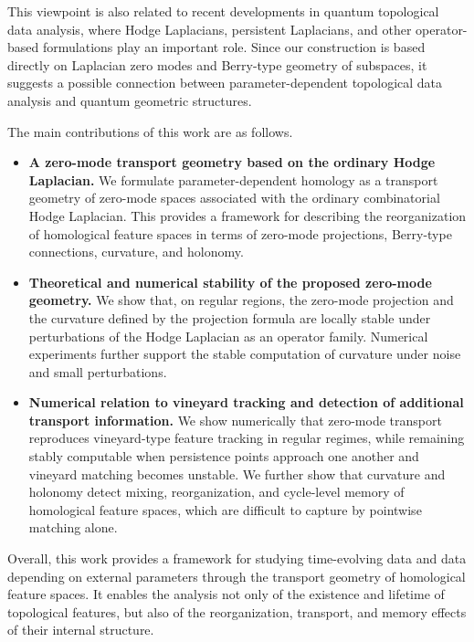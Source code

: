 \documentclass[pdflatex,sn-mathphys-num]{sn-jnl}%
\theoremstyle{thmstyleone}%
\theoremstyle{thmstyletwo}%
\theoremstyle{thmstylethree}%
\begin{document}
This viewpoint is also related to recent developments in quantum topological data analysis\cite{lloyd2016quantum,akhalwaya2024comparing,gyurik2022towards,yamauchi2025quantum,ameneyro2024quantum,hayakawa2022quantum,gyurik2024quantum}, where Hodge Laplacians, persistent Laplacians\cite{wei2025persistent,memoli2022persistent}, and other operator-based formulations play an important role. Since our construction is based directly on Laplacian zero modes and Berry-type geometry of subspaces, it suggests a possible connection between parameter-dependent topological data analysis and quantum geometric structures.

The main contributions of this work are as follows.

\begin{itemize}
    \item \textbf{A zero-mode transport geometry based on the ordinary Hodge Laplacian.}
    We formulate parameter-dependent homology as a transport geometry of zero-mode spaces associated with the ordinary combinatorial Hodge Laplacian. This provides a framework for describing the reorganization of homological feature spaces in terms of zero-mode projections, Berry-type connections, curvature, and holonomy.

    \item \textbf{Theoretical and numerical stability of the proposed zero-mode geometry.}
    We show that, on regular regions, the zero-mode projection and the curvature defined by the projection formula are locally stable under perturbations of the Hodge Laplacian as an operator family. Numerical experiments further support the stable computation of curvature under noise and small perturbations.

    \item \textbf{Numerical relation to vineyard tracking and detection of additional transport information.}
    We show numerically that zero-mode transport reproduces vineyard-type feature tracking in regular regimes, while remaining stably computable when persistence points approach one another and vineyard matching becomes unstable. We further show that curvature and holonomy detect mixing, reorganization, and cycle-level memory of homological feature spaces, which are difficult to capture by pointwise matching alone.
\end{itemize}

Overall, this work provides a framework for studying time-evolving data and data depending on external parameters through the transport geometry of homological feature spaces. It enables the analysis not only of the existence and lifetime of topological features, but also of the reorganization, transport, and memory effects of their internal structure.
\end{document}

